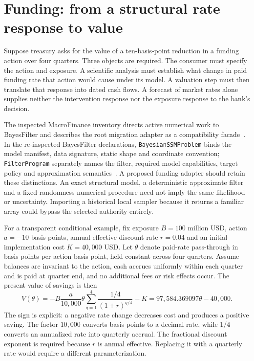 \section{Funding: from a structural rate response to value}

Suppose treasury asks for the value of a ten-basis-point reduction in a
funding action over four quarters. Three objects are required. The consumer
must specify the action and exposure. A scientific analysis must establish
what change in paid funding rate that action would cause under its model.
A valuation step must then translate that response into dated cash flows.
A forecast of market rates alone supplies neither the intervention response
nor the exposure response to the bank's decision.

The inspected MacroFinance inventory directs active numerical work to
BayesFilter and describes the root migration adapter as a compatibility
facade~\citep{v12_in_inventory}. In the re-inspected BayesFilter declarations,
\texttt{BayesianSSMProblem} binds the model manifest, data signature, static
shape and coordinate convention; \texttt{FilterProgram} separately names the
filter, required model capabilities, target policy and approximation
semantics~\citep{exec13_i3_inspection}. A proposed funding adapter should retain
these distinctions. An exact structural model, a deterministic approximate
filter and a fixed-randomness numerical procedure need not imply the same
likelihood or uncertainty. Importing a historical local sampler because it
returns a familiar array could bypass the selected authority entirely.

For a transparent conditional example, fix exposure $B=100$ million USD,
action $a=-10$ basis points, annual effective discount rate $r=0.04$ and an
initial implementation cost $K=40{,}000$ USD. Let $\theta$ denote paid-rate
pass-through in basis points per action basis point, held constant across
four quarters. Assume balances are invariant to the action, cash accrues
uniformly within each quarter and is paid at quarter end, and no additional
fees or risk effects occur. The present value of savings is then
\begin{equation}
 V(\theta)=-B\frac{a}{10{,}000}\theta
      \sum_{q=1}^{4}\frac{1/4}{(1+r)^{q/4}}-K
       =97{,}584.369097\theta-40{,}000.
 \label{exec13:i3-funding}
\end{equation}
The sign is explicit: a negative rate change decreases cost and produces a
positive saving. The factor $10{,}000$ converts basis points to a decimal
rate, while $1/4$ converts an annualized rate into quarterly accrual. The
fractional discount exponent is required because $r$ is annual effective.
Replacing it with a quarterly rate would require a different parameterization.

